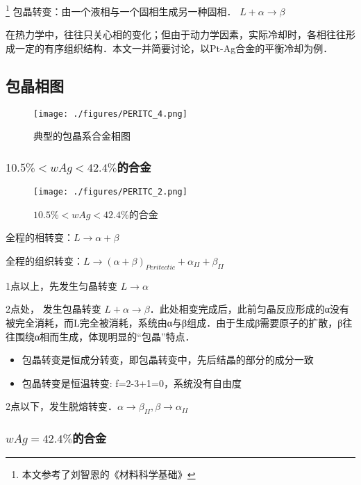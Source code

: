 
\footnote{本文参考了刘智恩的《材料科学基础》}
包晶转变：由一个液相与一个固相生成另一种固相． $L + \alpha \rightarrow \beta$

在热力学中，往往只关心相的变化；但由于动力学因素，实际冷却时，各相往往形成一定的有序组织结构．本文一并简要讨论，以Pt-Ag合金的平衡冷却为例．

\subsection{包晶相图}

\begin{figure}[ht]
\centering
\texttt{[image: ./figures/PERITC\_4.png]}
\caption{典型的包晶系合金相图} \label{PERITC_fig4}
\end{figure}

\subsubsection{$10.5\%<wAg<42.4\%$的合金} 
\begin{figure}[ht]
\centering
\texttt{[image: ./figures/PERITC\_2.png]}
\caption{$10.5\%<wAg<42.4\%$的合金} \label{PERITC_fig2}
\end{figure}

全程的相转变：$L \rightarrow \alpha+\beta$

全程的组织转变：$L \rightarrow (\alpha+\beta)_{Peritectic} + \alpha_{II} + \beta_{II}$

1点以上，先发生匀晶转变 $L \rightarrow \alpha$

2点处， 发生包晶转变 $L+ \alpha \rightarrow \beta$．此处相变完成后，此前匀晶反应形成的α没有被完全消耗，而L完全被消耗，系统由α与β组成．由于生成β需要原子的扩散，β往往围绕α相而生成，体现明显的“包晶”特点．
\begin{itemize}
\item 包晶转变是恒成分转变，即包晶转变中，先后结晶的部分的成分一致
\item 包晶转变是恒温转变: f=2-3+1=0，系统没有自由度
\end{itemize}

2点以下，发生脱熔转变．$\alpha \rightarrow \beta_{II}, \beta \rightarrow \alpha_{II}$

\subsubsection{$wAg=42.4\%$的合金} 

